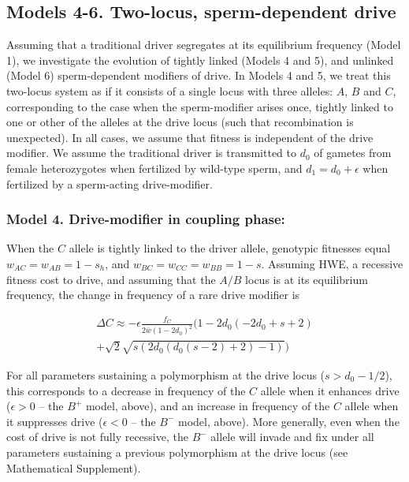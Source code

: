 \documentclass{pnastwo}
\begin{document}
\begin{article}
 
 
\subsection{Models 4-6. Two-locus, sperm-dependent drive} 
Assuming that a traditional driver segregates at its equilibrium frequency (Model 1), we investigate the evolution of tightly linked (Models 4 and 5), and unlinked (Model 6) sperm-dependent modifiers of drive. 
In Models 4 and 5, we treat this two-locus system as if it consists of
a single locus with three alleles: $A$, $B$ and $C$, corresponding to the case when the
sperm-modifier arises once, tightly linked to one or other of the
alleles at the drive locus (such that recombination is unexpected). 
In all cases, we assume that fitness is independent of the drive modifier.  
We assume the traditional driver is transmitted to $d_0$ of gametes from female heterozygotes  when fertilized by wild-type sperm, and $d_1=d_0+\epsilon$ when fertilized by a sperm-acting drive-modifier.

\subsubsection*{Model 4. Drive-modifier in coupling phase:}
When the $C$ allele is tightly linked to the driver allele, 
	genotypic fitnesses equal $w_{AC}=w_{AB}=1-s_h$, and $w_{BC}=w_{CC}=w_{BB}=1-s$. 
Assuming HWE, a recessive fitness cost to drive, and assuming that the $A/B$ locus is at its equilibrium frequency, the change in frequency of a rare drive modifier is


\begin{eqnarray}\nonumber
\Delta C\approx -\epsilon \frac{f_C}{2 \bar{w}(1-2 d_0)^2} \bigg( 1-2 d_0 (-2 d_0+s+2) \\
 +\sqrt{2} \sqrt{s (2 d_0 (d_0(s-2)+2)-1)} \bigg)
	\label{coupling}
\end{eqnarray} 



For all parameters sustaining a polymorphism at the drive locus ($s>d_0-1/2$), this corresponds to a decrease in frequency of the $C$ allele when it enhances drive ($\epsilon >0$ -- the $B^+$ model, above), 
	and an increase in frequency of the $C$ allele when it suppresses drive ($\epsilon <0$ -- the $B^-$ model, above). 
More generally, even when the cost of drive is not fully recessive, the $B^-$ allele will invade and fix under all parameters sustaining a previous polymorphism at the drive locus (see Mathematical Supplement). 
 

\end{article}
\end{document}
